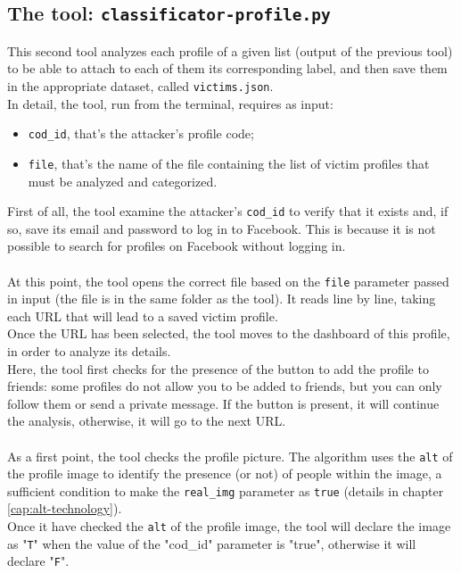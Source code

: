 \subsection{The tool: \texttt{classificator-profile.py}}
\label{cap:classificator-profiles}
This second tool analyzes each profile of a given list (output of the previous tool) to be able to attach to each of them its corresponding label, and then save them in the appropriate dataset, called \texttt{victims.json}.
\\In detail, the tool, run from the terminal, requires as input:
\begin{itemize}
	\item \texttt{cod\_id}, that's the attacker's profile code;
	\item \texttt{file}, that's the name of the file containing the list of victim profiles that must be analyzed and categorized.
\end{itemize}
First of all, the tool examine the attacker's \texttt{cod\_id} to verify that it exists and, if so, save its email and password to log in to Facebook. This is because it is not possible to search for profiles on Facebook without logging in.
\\\\At this point, the tool opens the correct file based on the \texttt{file} parameter passed in input (the file is in the same folder as the tool).
It reads line by line, taking each URL that will lead to a saved victim profile.\\Once the URL has been selected, the tool moves to the dashboard of this profile, in order to analyze its details.
\\Here, the tool first checks for the presence of the button to add the profile to friends: some profiles do not allow you to be added to friends, but you can only follow them or send a private message. If the button is present, it will continue the analysis, otherwise, it will go to the next URL.
\\\\ As a first point, the tool checks the profile picture.
The algorithm uses the \texttt{alt} of the profile image to identify the presence (or not) of people within the image, a sufficient condition to make the \texttt{real\_img} parameter as \texttt{true} (details in chapter \ref{cap:alt-technology}).
\\Once it have checked the \texttt{alt} of the profile image, the tool will declare the image as "\texttt{T}" when the value of the "cod\_id" parameter is "true", otherwise it will declare "\texttt{F}".
